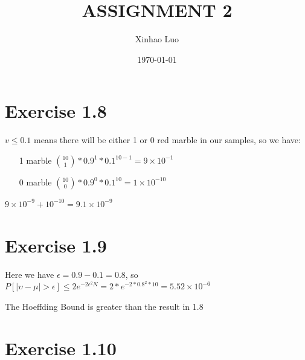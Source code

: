 \documentclass{article}
\title{\bf \Large ASSIGNMENT 2}
\author{Xinhao Luo}
\date{\today}
\def\math#1{$#1$}
\begin{document}
\maketitle
\medskip

\section{Exercise 1.8}
\math{v \leq 0.1} means there will be either 1 or 0 red marble in our samples, so we have:

\begin{itemize}
    \item [1 marble] \math{{10 \choose 1} * 0.9^1 * 0.1^{10 - 1} = 9 \times 10^{-1}}
    \item [0 marble] \math{{10 \choose 0} * 0.9^0 * 0.1^{10} = 1 \times 10^{-10}}
\end{itemize}

\math{9 \times 10^{-9} + 10^{-10} = 9.1 \times 10^{-9}}

\section{Exercise 1.9}

Here we have \math{\epsilon = 0.9 - 0.1 = 0.8}, so \math{P[\lvert \upsilon - \mu \rvert > \epsilon] \leq 2e^{-2\epsilon^2N} = 2 * e^{-2 * 0.8^2 * 10} = 5.52 \times 10^{-6}}

The Hoeffding Bound is greater than the result in 1.8

\section{Exercise 1.10}
\end{document}
